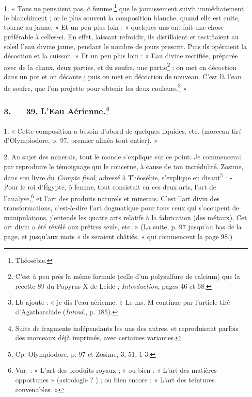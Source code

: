 \documentclass[a4paper, 11pt, oneside, polutonikogreek, french]{article}
\begin{document}
\paragraph{}
1. « Tous ne pensaient pas, ô femme,\footnote{Théosébie.} que le jaunissement suivît immédiatement le blanchiment ; or le plus souvent la composition blanche, quand elle est cuite, tourne au jaune. » Et un peu plus loin : « quelques-uns ont fait une chose préférable à celles-ci. En effet, laissant refroidir, ils distillaient et rectifiaient au soleil l'eau divine jaune, pendant le nombre de jours prescrit. Puis ils opéraient la décoction et la cuisson. » Et un peu plus loin : « Eau divine rectifiée, préparée avec de la chaux, deux parties, et du soufre, une partie\footnote{C'est à peu près la même formule (celle d'un polysulfure de calcium) que la recette 89 du Papyrus X de Leide ; \emph{Introduction}, pages 46 et 68.} ; on met en décoction dans un pot et on décante ; puis on met en décoction de nouveau. C'est là l'eau de soufre, que l'on projette pour obtenir les deux couleurs.\footnote{Lb ajoute : « je dis l'eau aérienne. » Le ms. M continue par l'article tiré d'Agatharchide (\emph{Introd.}, p. 185).} »

\bigskip
\centerline{\EightStarTaper}
\centerline{\EightStarTaper\EightStarTaper}
\bigskip

\subsubsection[3. --- 39. L'Eau Aérienne.]{3. --- 39. L'Eau Aérienne.\footnote{Suite de fragments indépendants les uns des autres, et reproduisant parfois des morceaux déjà imprimés, avec certaines variantes.}}
\paragraph{}
1. « Cette composition a besoin d'abord de quelques liquides, etc. (morceau tiré d'Olympiodore, p. 97, premier alinéa tout entier). »

2. Au sujet des minerais, tout le monde s'explique sur ce point. Je commencerai par reproduire le témoignage qui le concerne, à cause de ton incrédulité. Zosime, dans son livre du \emph{Compte final}, adressé à Théosébie, s'explique en disant\footnote{Cp. Olympiodore, p. 97 et Zosime, 3, 51, 1-3.} : « Pour le roi d'Égypte, ô femme, tout consistait en ces deux arts, l'art de l'analyse,\footnote{Var. : « L'art des produits royaux ; » ou bien : « L'art des matières opportunes » (astrologie ? ) ; ou bien encore : « L'art des teintures convenables. »} et l'art des produits naturels et minerais. C'est l'art divin des transformations, c'est-à-dire l'art dogmatique pour tous ceux qui s'occupent de manipulations, j'entends les quatre arts relatifs à la fabrication (des métaux). Cet art divin a été révélé aux prêtres seuls, etc. » (La suite, p. 97 jusqu'au bas de la page, et jusqu'aux mots « ils seraient châtiés, » qui commencent la page 98.)
\end{document}
